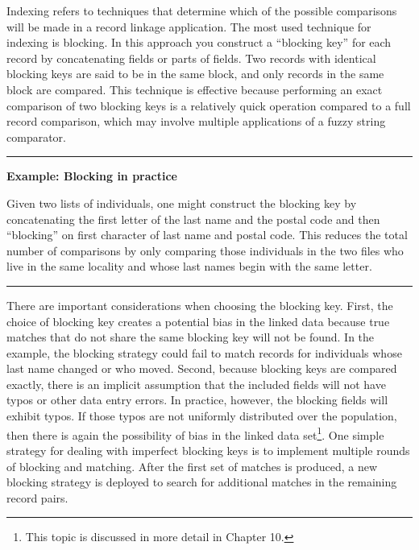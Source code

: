 \documentclass[]{krantz}
\begin{document}
Indexing refers to techniques that determine which of the possible
comparisons will be made in a record linkage application. The most used
technique for indexing is blocking. In this approach you construct a
``blocking key'' for each record by concatenating fields or parts of
fields. Two records with identical blocking keys are said to be in the
same block, and only records in the same block are compared. This
technique is effective because performing an exact comparison of two
blocking keys is a relatively quick operation compared to a full record
comparison, which may involve multiple applications of a fuzzy string
comparator.

\begin{center}\rule{0.5\linewidth}{\linethickness}\end{center}

\textbf{Example: Blocking in practice}

Given two lists of individuals, one might construct the blocking key by
concatenating the first letter of the last name and the postal code and
then ``blocking'' on first character of last name and postal code. This
reduces the total number of comparisons by only comparing those
individuals in the two files who live in the same locality and whose
last names begin with the same letter.

\begin{center}\rule{0.5\linewidth}{\linethickness}\end{center}

There are important considerations when choosing the blocking key.
First, the choice of blocking key creates a potential bias in the linked
data because true matches that do not share the same blocking key will
not be found. In the example, the blocking strategy could fail to match
records for individuals whose last name changed or who moved. Second,
because blocking keys are compared exactly, there is an implicit
assumption that the included fields will not have typos or other data
entry errors. In practice, however, the blocking fields will exhibit
typos. If those typos are not uniformly distributed over the population,
then there is again the possibility of bias in the linked data
set\footnote{This topic is discussed in more detail in Chapter 10.}. One
simple strategy for dealing with imperfect blocking keys is to implement
multiple rounds of blocking and matching. After the first set of matches
is produced, a new blocking strategy is deployed to search for
additional matches in the remaining record pairs.
\end{document}
